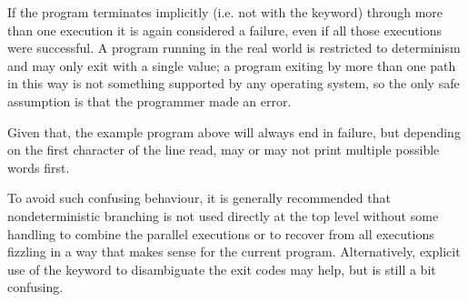 If the program terminates implicitly (i.e. not with the  keyword)
through more than one execution it is again considered a failure, even if
all those executions were successful. A program running in the real world
is restricted to determinism and may only exit with a single value;
a program exiting by more than one path in this way is not something
supported by any operating system, so the only safe assumption is that
the programmer made an error.

Given that, the example program above will always end in failure, but
depending on the first character of the line read, may or may not
print multiple possible words first.

To avoid such confusing behaviour, it is generally recommended that
nondeterministic branching is not used directly at the top level without
some handling to combine the parallel executions or to recover from all
executions fizzling in a way that makes sense for the current program.
Alternatively, explicit use of the  keyword to disambiguate the
exit codes may help, but is still a bit confusing.
